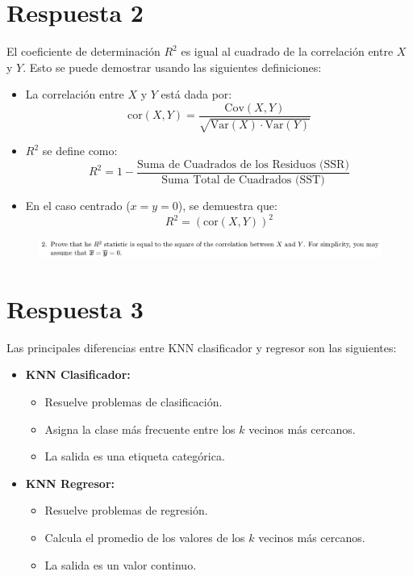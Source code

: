 \documentclass[12pt]{report}
\begin{document}
\section*{Respuesta 2}
El coeficiente de determinación \(R^2\) es igual al cuadrado de la correlación entre \(X\) y \(Y\). Esto se puede demostrar usando las siguientes definiciones:

\begin{itemize}
	\item La correlación entre \(X\) y \(Y\) está dada por:
	\[
	\text{cor}(X, Y) = \frac{\text{Cov}(X, Y)}{\sqrt{\text{Var}(X) \cdot \text{Var}(Y)}}
	\]
	\item \(R^2\) se define como:
	\[
	R^2 = 1 - \frac{\text{Suma de Cuadrados de los Residuos (SSR)}}{\text{Suma Total de Cuadrados (SST)}}
	\]
	\item En el caso centrado (\(x = y = 0\)), se demuestra que:
	\[
	R^2 = \left( \text{cor}(X, Y) \right)^2
	\]
\end{itemize}


\begin{figure}[H]
	\centering
	\includegraphics[width=1\textwidth]{screenshot004}
\end{figure}

\section*{Respuesta 3}
Las principales diferencias entre KNN clasificador y regresor son las siguientes:

\begin{itemize}
	\item \textbf{KNN Clasificador:}
	\begin{itemize}
		\item Resuelve problemas de clasificación.
		\item Asigna la clase más frecuente entre los \(k\) vecinos más cercanos.
		\item La salida es una etiqueta categórica.
	\end{itemize}
	
	\item \textbf{KNN Regresor:}
	\begin{itemize}
		\item Resuelve problemas de regresión.
		\item Calcula el promedio de los valores de los \(k\) vecinos más cercanos.
		\item La salida es un valor continuo.
	\end{itemize}
\end{itemize}
\end{document}
